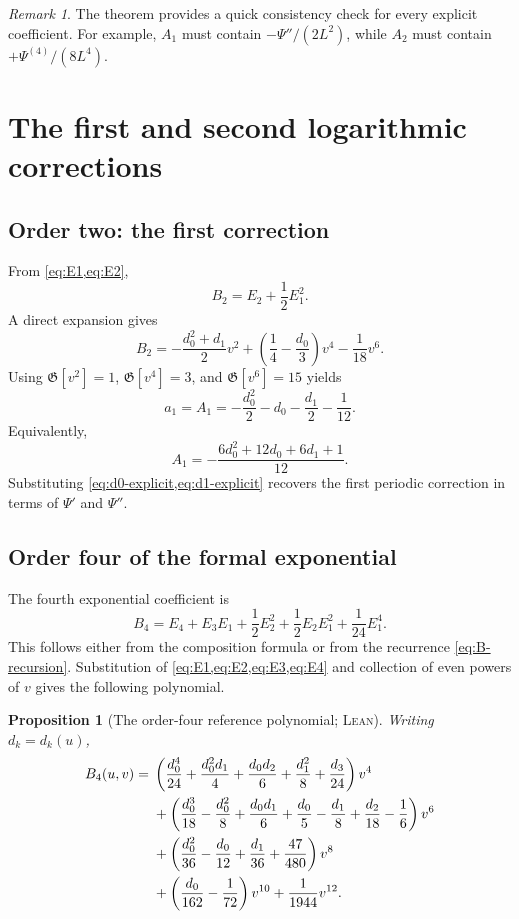 \documentclass[11pt,oneside]{article}
\newtheorem{proposition}[theorem]{Proposition}
\theoremstyle{definition}
\theoremstyle{remark}
\newtheorem{remark}[theorem]{Remark}
\newcommand{\Gauss}{\mathfrak G}
\newcommand{\Formalized}{\textsc{Lean}}
\begin{document}
\begin{remark}
The theorem provides a quick consistency check for every explicit
coefficient.  For example, $A_1$ must contain
$-\Psi''/(2L^2)$, while $A_2$ must contain
$+\Psi^{(4)}/(8L^4)$.
\end{remark}

\section{The first and second logarithmic corrections}
\label{sec:second-correction}

\subsection{Order two: the first correction}

From \cref{eq:E1,eq:E2},
\[
 B_2=E_2+\frac12E_1^2.
\]
A direct expansion gives
\[
 B_2
 =-\frac{d_0^2+d_1}{2}v^2
   +\left(\frac14-\frac{d_0}{3}\right)v^4
   -\frac1{18}v^6.
\]
Using $\Gauss[v^2]=1$, $\Gauss[v^4]=3$, and
$\Gauss[v^6]=15$ yields
\begin{equation}
 a_1=A_1
 =-\frac{d_0^2}{2}-d_0-\frac{d_1}{2}-\frac1{12}.
 \label{eq:A1-jets}
\end{equation}
Equivalently,
\[
 A_1=-\frac{6d_0^2+12d_0+6d_1+1}{12}.
\]
Substituting \cref{eq:d0-explicit,eq:d1-explicit} recovers the first
periodic correction in terms of $\Psi'$ and $\Psi''$.

\subsection{Order four of the formal exponential}

The fourth exponential coefficient is
\begin{equation}
 B_4
 =E_4+E_3E_1+\frac12E_2^2
   +\frac12E_2E_1^2+\frac1{24}E_1^4.
 \label{eq:B4-identity}
\end{equation}
This follows either from the composition formula or from the recurrence
\eqref{eq:B-recursion}.  Substitution of
\cref{eq:E1,eq:E2,eq:E3,eq:E4} and collection of even powers of $v$
gives the following polynomial.

\begin{proposition}[The order-four reference polynomial; \Formalized]
\label{prop:B4-polynomial}
Writing $d_k=d_k(u)$,
\begin{align}
 B_4(u,v)={}&
 \left(\frac{d_0^4}{24}+\frac{d_0^2d_1}{4}
       +\frac{d_0d_2}{6}+\frac{d_1^2}{8}
       +\frac{d_3}{24}\right)v^4 \notag\\
 &+\left(\frac{d_0^3}{18}-\frac{d_0^2}{8}
       +\frac{d_0d_1}{6}+\frac{d_0}{5}
       -\frac{d_1}{8}+\frac{d_2}{18}
       -\frac16\right)v^6 \notag\\
 &+\left(\frac{d_0^2}{36}-\frac{d_0}{12}
       +\frac{d_1}{36}+\frac{47}{480}\right)v^8 \notag\\
 &+\left(\frac{d_0}{162}-\frac1{72}\right)v^{10}
   +\frac1{1944}v^{12}. \label{eq:B4-polynomial}
\end{align}
\end{proposition}
\end{document}
